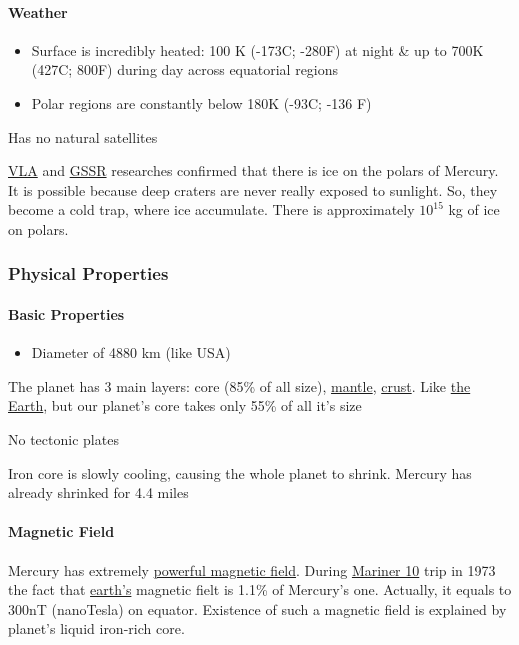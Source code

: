 \paragraph{Weather}
\begin{itemize}
	\item Surface is incredibly heated: 100 K (-173\degree C; -280\degree F)
		at night \& up to 700K (427\degree C; 800\degree F) during day
		across equatorial regions
	\item Polar regions are constantly below 180K (-93\degree C; -136\degree
		F)
\end{itemize}
Has no natural satellites

\href{https://en.wikipedia.org/wiki/Very_Large_Array}{VLA} and
\href{https://en.wikipedia.org/wiki/Goldstone_Solar_System_Radar}{GSSR}
researches confirmed that there is ice on the polars of Mercury. It is possible
because deep craters are never really exposed to sunlight. So, they become a
cold trap, where ice accumulate. There is approximately $10^{15}$ kg of ice on
polars.
\subsubsection{Physical Properties}
\paragraph{Basic Properties}
\begin{itemize}
	\item Diameter of 4880 km (like USA)
\end{itemize}
The planet has 3 main layers: core (85\% of all size),
\href{https://education.nationalgeographic.org/resource/mantle/}{mantle},
\href{https://education.nationalgeographic.org/resource/crust/}{crust}. Like
\hyperref[planet:earth]{the Earth}, but our planet's core takes only 55\% of all
it's size

No tectonic plates

Iron core is slowly cooling, causing the whole planet to shrink. Mercury has
already shrinked for 4.4 miles
\paragraph{Magnetic Field}
Mercury has extremely
\href{https://en.wikipedia.org/wiki/Mercury\%27s_magnetic_field}{powerful
magnetic field}. During \hyperref[planet:mercury:splacecreft:mariner10]{Mariner
10} trip in 1973 the fact that \hyperref[planet:earth]{earth's} magnetic fielt
is 1.1\% of Mercury's one. Actually, it equals to 300nT (nanoTesla) on equator.
Existence of such a magnetic field is explained by planet's liquid iron-rich
core.

